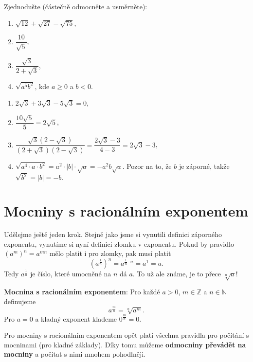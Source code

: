 \begin{problem}
  Zjednodušte (částečně odmocněte a usměrněte):
  \begin{enumerate}[label=(\alph*)]
    \item $\sqrt{12} + \sqrt{27} - \sqrt{75}$,
    \item $\dfrac{10}{\sqrt{5}}$,
    \item $\dfrac{\sqrt{3}}{2 + \sqrt{3}}$,
    \item $\sqrt{a^5b^2}$, kde $a\geq 0$ a $b < 0$.
  \end{enumerate}
\end{problem}

\begin{solution}
  \begin{enumerate}[label=(\alph*)]
    \item $2\sqrt{3} + 3\sqrt{3} - 5\sqrt{3} = 0$,
    \item $\dfrac{10\sqrt{5}}{5} = 2\sqrt{5}$,
    \item $\dfrac{\sqrt{3}(2 - \sqrt{3})}{(2 + \sqrt{3})(2 - \sqrt{3})} = \dfrac{2\sqrt{3} - 3}{4 - 3} = 2\sqrt{3} - 3$,
    \item $\sqrt{a^4\cdot a\cdot b^2} = a^2\cdot|b|\cdot\sqrt{a} = -a^2b\sqrt{a}$. Pozor na to, že $b$ je záporné, takže $\sqrt{b^2} = |b| = -b$.
  \end{enumerate}
\end{solution}

\section{Mocniny s racionálním exponentem}\label{sec:mocniny-racionalni}

Udělejme ještě jeden krok. Stejně jako jsme si vynutili definici záporného exponentu, vynutíme si nyní definici zlomku v exponentu. Pokud by pravidlo ${(a^m)}^n = a^{mn}$ mělo platit i pro zlomky, pak musí platit
\begin{equation*}
  {\left(a^{\frac{1}{n}}\right)}^n = a^{\frac{1}{n}\cdot n} = a^1 = a.
\end{equation*}
Tedy $a^{\frac{1}{n}}$ je číslo, které umocněné na $n$ dá $a$. To už ale známe, je to přece $\sqrt[n]{a}$!

\begin{definitionbox}
  \textbf{Mocnina s racionálním exponentem}: Pro každé $a > 0$, $m\in\mathbb{Z}$ a $n\in\mathbb{N}$ definujeme
  \begin{equation*}
    a^{\frac{m}{n}} = \sqrt[n]{a^m}.
  \end{equation*}
  Pro $a = 0$ a kladný exponent klademe $0^{\frac{m}{n}} = 0$.

  \vspace{0.2cm}

  Pro mocniny s racionálním exponentem opět platí všechna pravidla pro počítání s mocninami (pro kladné základy). Díky tomu můžeme \textbf{odmocniny převádět na mocniny} a počítat s nimi mnohem pohodlněji.
\end{definitionbox}

